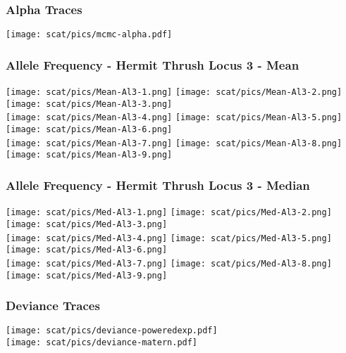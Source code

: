 \begin{frame}
\frametitle{Alpha Traces}
\begin{center}
\texttt{[image: scat/pics/mcmc-alpha.pdf]}\\
\end{center}
\end{frame}



\begin{frame}
\frametitle{Allele Frequency - Hermit Thrush Locus 3 - Mean}

\begin{changemargin}{2cm}{-6.5cm}
\texttt{[image: scat/pics/Mean-Al3-1.png]}
\texttt{[image: scat/pics/Mean-Al3-2.png]}
\texttt{[image: scat/pics/Mean-Al3-3.png]} \\
\texttt{[image: scat/pics/Mean-Al3-4.png]}
\texttt{[image: scat/pics/Mean-Al3-5.png]} 
\texttt{[image: scat/pics/Mean-Al3-6.png]} \\
\texttt{[image: scat/pics/Mean-Al3-7.png]}
\texttt{[image: scat/pics/Mean-Al3-8.png]}
\texttt{[image: scat/pics/Mean-Al3-9.png]}
\end{changemargin}

\end{frame}


\begin{frame}
\frametitle{Allele Frequency - Hermit Thrush Locus 3 - Median}

\begin{changemargin}{2cm}{-6.5cm}
\texttt{[image: scat/pics/Med-Al3-1.png]}
\texttt{[image: scat/pics/Med-Al3-2.png]}
\texttt{[image: scat/pics/Med-Al3-3.png]} \\
\texttt{[image: scat/pics/Med-Al3-4.png]}
\texttt{[image: scat/pics/Med-Al3-5.png]} 
\texttt{[image: scat/pics/Med-Al3-6.png]} \\
\texttt{[image: scat/pics/Med-Al3-7.png]}
\texttt{[image: scat/pics/Med-Al3-8.png]}
\texttt{[image: scat/pics/Med-Al3-9.png]}
\end{changemargin}

\end{frame}




\begin{frame}
\frametitle{Deviance Traces}

\vspace{-3mm}

\texttt{[image: scat/pics/deviance-poweredexp.pdf]}\\
\texttt{[image: scat/pics/deviance-matern.pdf]}
\end{frame}



